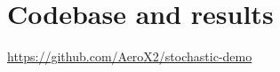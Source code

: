 \documentclass[a4paper,oneside,phd,etd]{BYUPhys}
\begin{document}

\appendix
\section{Codebase and results}
\url{https://github.com/AeroX2/stochastic-demo}

%

%

%
\end{document}
